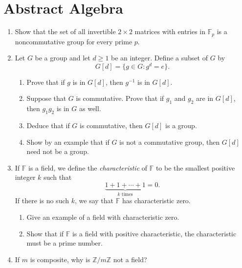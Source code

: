 \documentclass[11pt,letterpaper]{article}
\newcommand{\Z}{\mathbb{Z}}
\newcommand{\F}{\mathbb{F}}
\begin{document}
\section{Abstract Algebra}
\begin{enumerate}
    \item Show that the set of all invertible $2\times 2$ matrices with entries in $\F_p$ is a noncommutative group for every prime $p$.

    \item Let $G$ be a group and let $d\geq 1$ be an integer. Define a subset of $G$ by
    \[
        G[d] = \{g\in G: g^d = e\}.
    \]
    \begin{enumerate}
        \item Prove that if $g$ is in $G[d]$, then $g^{-1}$ is in $G[d]$.
        \item Suppose that $G$ is commutative. Prove that if $g_1$ and $g_2$ are in $G[d]$, then $g_1g_2$ is in $G$ as well.
        \item Deduce that if $G$ is commutative, then $G[d]$ is a group.
        \item Show by an example that if $G$ is not a commutative group, then $G[d]$ need not be a group.
    \end{enumerate}

    \item If $\F$ is a field, we define the \emph{characteristic} of $\F$ to be the smallest positive integer $k$ such that
    \[
        \underbrace{1 + 1 + \cdots + 1}_{k\text{ times}} = 0.
    \]
    If there is no such $k$, we say that $\F$ has characteristic zero.
    \begin{enumerate}
        \item Give an example of a field with characteristic zero.

        \item Show that if $\F$ is a field with positive characteristic, the characteristic must be a prime number.
    \end{enumerate}

    \item If $m$ is composite, why is $\Z/m\Z$ not a field?
\end{enumerate}
\end{document}
